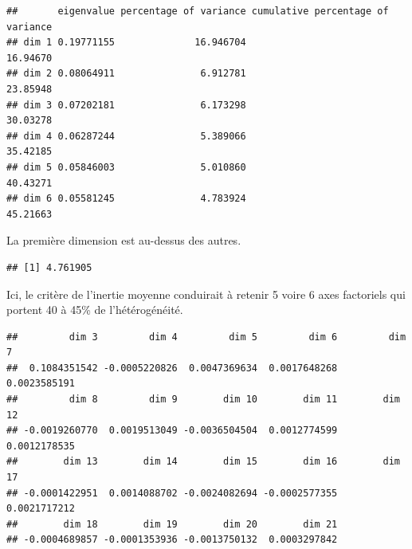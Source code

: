 \documentclass[]{book}
\newenvironment{Shaded}{\begin{snugshade}}{\end{snugshade}}
\newcommand{\DataTypeTok}[1]{\textcolor[rgb]{0.13,0.29,0.53}{#1}}
\newcommand{\DecValTok}[1]{\textcolor[rgb]{0.00,0.00,0.81}{#1}}
\newcommand{\KeywordTok}[1]{\textcolor[rgb]{0.13,0.29,0.53}{\textbf{#1}}}
\newcommand{\NormalTok}[1]{#1}
\newcommand{\OperatorTok}[1]{\textcolor[rgb]{0.81,0.36,0.00}{\textbf{#1}}}
\newcommand{\StringTok}[1]{\textcolor[rgb]{0.31,0.60,0.02}{#1}}
\begin{document}
\begin{verbatim}
##       eigenvalue percentage of variance cumulative percentage of variance
## dim 1 0.19771155              16.946704                          16.94670
## dim 2 0.08064911               6.912781                          23.85948
## dim 3 0.07202181               6.173298                          30.03278
## dim 4 0.06287244               5.389066                          35.42185
## dim 5 0.05846003               5.010860                          40.43271
## dim 6 0.05581245               4.783924                          45.21663
\end{verbatim}

La première dimension est au-dessus des autres.

\begin{Shaded}
\end{Shaded}

\begin{verbatim}
## [1] 4.761905
\end{verbatim}

Ici, le critère de l'inertie moyenne conduirait à retenir 5 voire 6 axes factoriels qui portent 40 à 45\% de l'hétérogénéité.

\begin{Shaded}
\end{Shaded}

\begin{verbatim}
##         dim 3         dim 4         dim 5         dim 6         dim 7 
##  0.1084351542 -0.0005220826  0.0047369634  0.0017648268  0.0023585191 
##         dim 8         dim 9        dim 10        dim 11        dim 12 
## -0.0019260770  0.0019513049 -0.0036504504  0.0012774599  0.0012178535 
##        dim 13        dim 14        dim 15        dim 16        dim 17 
## -0.0001422951  0.0014088702 -0.0024082694 -0.0002577355  0.0021717212 
##        dim 18        dim 19        dim 20        dim 21 
## -0.0004689857 -0.0001353936 -0.0013750132  0.0003297842
\end{verbatim}
\end{document}
